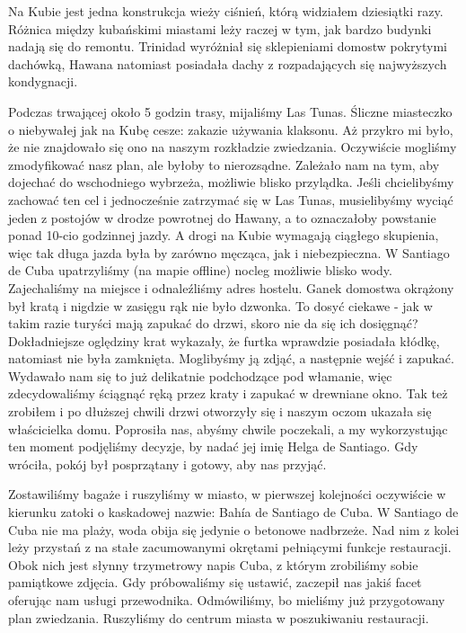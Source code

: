 Na Kubie jest jedna konstrukcja wieży ciśnień, którą widziałem dziesiątki razy.
Różnica między kubańskimi miastami leży raczej w tym, jak bardzo budynki nadają się do remontu.
Trinidad wyróżniał się sklepieniami domostw pokrytymi dachówką, 
Hawana natomiast posiadała dachy z rozpadających się najwyższych kondygnacji.
\par Podczas trwającej około 5 godzin trasy, mijaliśmy Las Tunas.
Śliczne miasteczko o niebywałej jak na Kubę cesze: zakazie używania klaksonu.
Aż przykro mi było, że nie znajdowało się ono na naszym rozkładzie zwiedzania.
Oczywiście mogliśmy zmodyfikować nasz plan, ale byłoby to nierozsądne.
Zależało nam na tym, aby dojechać do wschodniego wybrzeża, możliwie blisko przylądka.
Jeśli chcielibyśmy zachować ten cel i jednocześnie zatrzymać się w Las Tunas, musielibyśmy wyciąć jeden z postojów w drodze powrotnej do Hawany, a to oznaczałoby powstanie ponad 10-cio godzinnej jazdy.
A drogi na Kubie wymagają ciągłego skupienia, więc tak długa jazda była by zarówno męcząca, jak i niebezpieczna.
W Santiago de Cuba upatrzyliśmy (na mapie offline) nocleg możliwie blisko wody.
Zajechaliśmy na miejsce i odnaleźliśmy adres hostelu.
Ganek domostwa okrążony był kratą i nigdzie w zasięgu rąk nie było dzwonka.
To dosyć ciekawe - jak w takim razie turyści mają zapukać do drzwi, skoro nie da się ich dosięgnąć?
Dokładniejsze oględziny krat wykazały, że furtka wprawdzie posiadała kłódkę, natomiast nie była zamknięta.
Moglibyśmy ją zdjąć, a następnie wejść i zapukać.
Wydawało nam się to już delikatnie podchodzące pod włamanie, więc zdecydowaliśmy ściągnąć ręką przez kraty i zapukać w drewniane okno.
Tak też zrobiłem i po dłuższej chwili drzwi otworzyły się i naszym oczom ukazała się właścicielka domu.
Poprosiła nas, abyśmy chwile poczekali, a my wykorzystując ten moment podjęliśmy decyzje, by nadać jej imię Helga de Santiago.
Gdy wróciła, pokój był posprzątany i gotowy, aby nas przyjąć.
\par Zostawiliśmy bagaże i ruszyliśmy w miasto, w pierwszej kolejności oczywiście w kierunku zatoki o kaskadowej nazwie: Bahía de Santiago de Cuba.
W Santiago de Cuba nie ma plaży, woda obija się jedynie o betonowe nadbrzeże.
Nad nim z kolei leży przystań z na stałe zacumowanymi okrętami pełniącymi funkcje restauracji.
Obok nich jest słynny trzymetrowy napis Cuba, z którym zrobiliśmy sobie pamiątkowe zdjęcia.
Gdy próbowaliśmy się ustawić, zaczepił nas jakiś facet oferując nam usługi przewodnika.
Odmówiliśmy, bo mieliśmy już przygotowany plan zwiedzania.
Ruszyliśmy do centrum miasta w poszukiwaniu restauracji.
